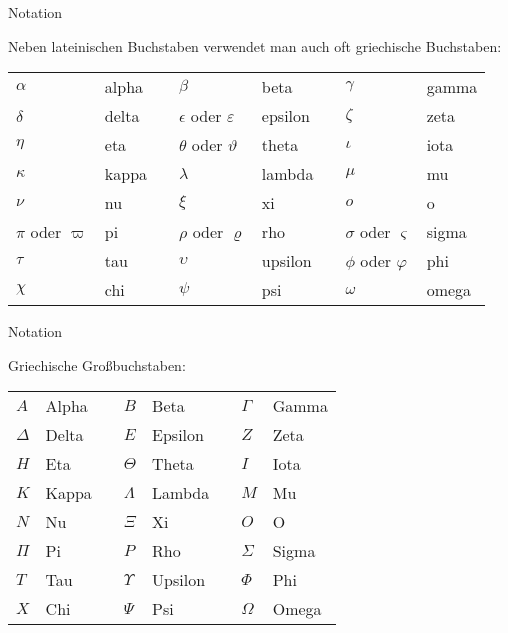 \documentclass[german]{beamer}
\begin{document}
\begin{frame}{Notation}

{\small
Neben lateinischen Buchstaben
verwendet man auch oft griechische Buchstaben:
}
{\footnotesize
\begin{center}
\begin{tabular}{llllllll}
\alert{$\alpha$} & alpha 
&&
\alert{$\beta$} & beta
&&
\alert{$\gamma$} & gamma
\\
\alert{$\delta$} & delta
&&
\alert{$\epsilon$} oder \alert{$\varepsilon$} & epsilon
&&
\alert{$\zeta$} & zeta
\\
\alert{$\eta$} & eta
&&
\alert{$\theta$} oder \alert{$\vartheta$} & theta
&&
\alert{$\iota$} & iota
\\
\alert{$\kappa$} & kappa
&&
\alert{$\lambda$} & lambda
&&
\alert{$\mu$} & mu
\\
\alert{$\nu$} & nu
&&
\alert{$\xi$} & xi
&&
\alert{$o$} & o
\\
\alert{$\pi$} oder \alert{$\varpi$} & pi
&&
\alert{$\rho$} oder \alert{$\varrho$} & rho
&&
\alert{$\sigma$} oder \alert{$\varsigma$} & sigma
\\
\alert{$\tau$} & tau
&&
\alert{$\upsilon$} & upsilon
&&
\alert{$\phi$} oder \alert{$\varphi$} & phi
\\
\alert{$\chi$} & chi
&&
\alert{$\psi$} & psi
&&
\alert{$\omega$} & omega
\\
\end{tabular}
\end{center}
}

\end{frame}

\begin{frame}{Notation}

{\small
Griechische Gro{\ss}buchstaben:
}
{\footnotesize
\begin{center}
\begin{tabular}{llllllll}
\alert{$A$} & Alpha 
&&
\alert{$B$} & Beta
&&
\alert{$\Gamma$} & Gamma
\\
\alert{$\Delta$} & Delta
&&
\alert{$E$} & Epsilon
&&
\alert{$Z$} & Zeta
\\
\alert{$H$} & Eta
&&
\alert{$\Theta$} & Theta
&&
\alert{$I$} & Iota
\\
\alert{$K$} & Kappa
&&
\alert{$\Lambda$} & Lambda
&&
\alert{$M$} & Mu
\\
\alert{$N$} & Nu
&&
\alert{$\Xi$} & Xi
&&
\alert{$O$} & O
\\
\alert{$\Pi$} & Pi
&&
\alert{$P$} & Rho
&&
\alert{$\Sigma$} & Sigma
\\
\alert{$T$} & Tau
&&
\alert{$\Upsilon$} & Upsilon
&&
\alert{$\Phi$} & Phi
\\
\alert{$X$} & Chi
&&
\alert{$\Psi$} & Psi
&&
\alert{$\Omega$} & Omega
\\
\end{tabular}
\end{center}
}

\end{frame}
\end{document}
